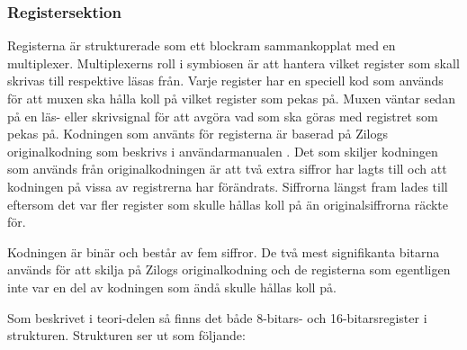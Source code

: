 \documentclass[main.tex]{subfiles}
\begin{document}
\subsubsection{Registersektion}
Registerna är strukturerade som ett blockram sammankopplat med en multiplexer.
Multiplexerns roll i symbiosen är att hantera vilket register som skall skrivas
till respektive läsas från. Varje register har en speciell kod som används för
att muxen ska hålla koll på vilket register som pekas på. Muxen väntar sedan på
en läs- eller skrivsignal för att avgöra vad som ska göras med registret som
pekas på. Kodningen som använts för registerna är baserad på Zilogs
originalkodning som beskrivs i användarmanualen \cite{z80um}. Det som skiljer
kodningen som används från originalkodningen är att två extra siffror har lagts
till och att kodningen på vissa av registrerna har förändrats. Siffrorna längst
fram lades till eftersom det var fler register som skulle hållas koll på än
originalsiffrorna räckte för.

Kodningen är binär och består av fem siffror. De två mest signifikanta bitarna
används för att skilja på Zilogs originalkodning och de registerna som
egentligen inte var en del av kodningen som ändå skulle hållas koll på.

Som beskrivet i teori-delen så finns det både 8-bitars- och 16-bitarsregister i
strukturen. Strukturen ser ut som följande:
\end{document}
